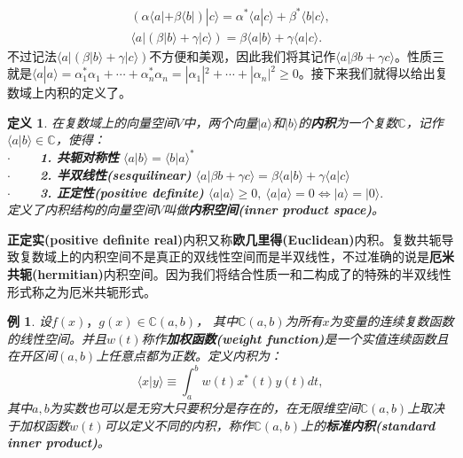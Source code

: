 \documentclass[mathserif,hyperref,UTF8,openany,b5paper]{ctexbook}
\newtheorem{exmp}{例}[section]
\newtheorem{defn}{定义}[section]
\begin{document}
\begin{align}
(\alpha\langle a|+\beta\langle b|)|c\rangle=\alpha^*\langle a|c\rangle+\beta^*\langle b|c\rangle,\\
\langle a|(\beta|b\rangle+\gamma|c\rangle)=\beta\langle a|b\rangle + \gamma\langle a|c\rangle.
\end{align}不过记法$\langle a|(\beta|b\rangle+\gamma|c\rangle)$不方便和美观，因此我们将其记作$\langle a|\beta b+\gamma c\rangle$。性质三就是$\langle a|a\rangle =\alpha_1^*\alpha_1+\cdots+\alpha_n^*\alpha_n=|\alpha_1|^2+\cdots+|\alpha_n|^2 \geq 0$。接下来我们就得以给出复数域上内积的定义了。
\begin{defn}
在复数域上的向量空间$V$中，两个向量$|a\rangle$和$|b\rangle$的\textbf{内积}为一个复数$\mathbb{C}$，记作$\langle a|b\rangle\in \mathbb{C}$，使得：\\
$\cdot \qquad$ \textbf{1. 共轭对称性} $\langle a|b\rangle = \langle b|a\rangle^* $\\
$\cdot \qquad$ \textbf{2. 半双线性(sesquilinear)} $\langle a|\beta b+\gamma c\rangle=\beta\langle a|b\rangle + \gamma\langle a|c\rangle$\\
$\cdot \qquad$ \textbf{3. 正定性(positive definite)} $\langle a|a\rangle \geq 0 , \ \langle a|a\rangle = 0 \Leftrightarrow |a\rangle = |0\rangle.$\\
定义了内积结构的向量空间$V$叫做\textbf{内积空间(inner product space)}。
\end{defn}

\textbf{正定实(positive definite real)}内积又称\textbf{欧几里得(Euclidean)}内积。复数共轭导致复数域上的内积空间不是真正的双线性空间而是半双线性，不过准确的说是\textbf{厄米共轭(hermitian)}内积空间。因为我们将结合性质一和二构成了的特殊的半双线性形式称之为厄米共轭形式。
\begin{exmp}
设$f(x)，g(x)\in \mathbb{C}(a,b)$， 其中$\mathbb{C}(a,b)$为所有$x$为变量的连续复数函数的线性空间。并且$w(t)$称作\textbf{加权函数(weight function)}是一个实值连续函数且在开区间$(a,b)$上任意点都为正数。定义内积为：
\begin{equation}
    \langle x|y\rangle \equiv \int_a^b w(t)x^*(t)y(t)dt,
\end{equation}
其中$a,b$为实数也可以是无穷大只要积分是存在的，在无限维空间$\mathbb{C}(a,b)$上取决于加权函数$w(t)$可以定义不同的内积，称作$\mathbb{C}(a,b)$上的\textbf{标准内积(standard inner product)}。
\end{exmp}
\end{document}
